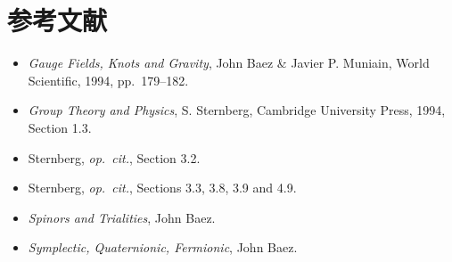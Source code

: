 \section*{参考文献}

\begin{itemize}
  \item[{[1]}] \emph{Gauge Fields, Knots and Gravity}, John Baez \& Javier P. Muniain, World Scientific, 1994, pp.~179--182.
  \item[{[2]}] \emph{Group Theory and Physics}, S. Sternberg, Cambridge University Press, 1994, Section 1.3.
  \item[{[3]}] Sternberg, \emph{op.~cit.}, Section 3.2.
  \item[{[4]}] Sternberg, \emph{op.~cit.}, Sections 3.3, 3.8, 3.9 and 4.9.
  \item[{[5]}] \emph{Spinors and Trialities}, John Baez.
  \item[{[6]}] \emph{Symplectic, Quaternionic, Fermionic}, John Baez.
\end{itemize}
